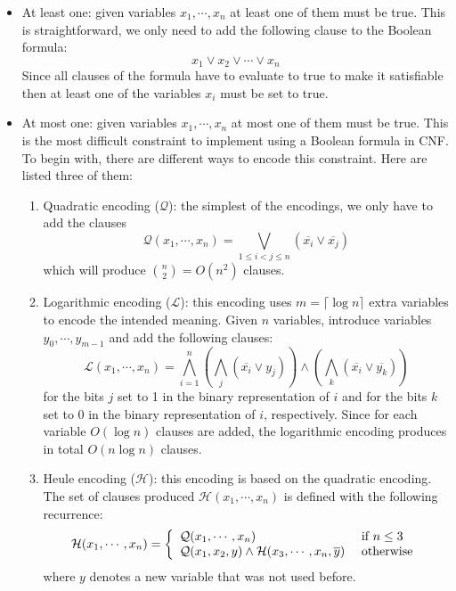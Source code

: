 \begin{itemize}
	\item At least one: given variables $x_1,\cdots,x_n$ at least
	one of them must be true. This is straightforward, we only need
	to add the following clause to the Boolean formula:
	\begin{equation}
	\label{eq:cnf:at-least-one}
	x_1 \vee x_2 \vee \cdots \vee x_n
	\end{equation}
	Since all clauses of the formula have to evaluate to true to make
	it satisfiable then at least one of the variables $x_i$ must be set to true.
	
	\item At most one: given variables $x_1,\cdots,x_n$ at most
	one of them must be true. This is the most difficult constraint
	to implement using a Boolean formula in CNF. To begin with, there
	are different ways to encode this constraint. Here are listed
	three of them:
	\begin{enumerate}
		\item Quadratic encoding ($\mathcal{Q}$): the simplest of the
		encodings, we only have to add the clauses
		\begin{equation}
		\label{eq:cnf:at-most-one:quad}
		\mathcal{Q}(x_1,\cdots, x_n) =
		\bigvee_{1 \le i < j \le n} (\overline{x_i}\vee\overline{x_j})
		\end{equation}
		which will produce $\binom{n}{2} = O(n^2)$ clauses.
		
		\item Logarithmic encoding ($\mathcal{L}$): this encoding uses
		$m = \lceil \log{n} \rceil$ extra variables to encode the
		intended meaning. Given $n$ variables, introduce variables
		$y_0,\cdots,y_{m-1}$ and add the following clauses:
		\begin{equation}
		\label{eq:cnf:at-most-one:log}
		\mathcal{L}(x_1,\cdots, x_n) = 
		\bigwedge_{i=1}^n
		\left(\bigwedge_{j} (\overline{x_i} \vee y_j) \right)
		\wedge
		\left(\bigwedge_{k} (\overline{x_i} \vee \overline{y_k}) \right)
		\end{equation}
		for the bits $j$ set to 1 in the binary representation of $i$ and
		for the bits $k$ set to 0 in the binary representation of $i$, respectively.
		Since for each variable $O(\log{n})$ clauses are added, the logarithmic
		encoding produces in total $O(n\log{n})$ clauses.
		
		\item Heule encoding ($\mathcal{H}$): this encoding is based on
		the quadratic encoding. The set of clauses produced $\mathcal{H}(x_1,\cdots, x_n)$
		is defined with the following recurrence:
		\begin{equation}
		\label{eq:cnf:at-most-one:heule}
		\mathcal{H}(x_1,\cdots, x_n) =
		\left\{
		\begin{array}{l l}
		\mathcal{Q}(x_1,\cdots, x_n) & \text{ if } n \le 3 \\
		\mathcal{Q}(x_1,x_2,y) \wedge \mathcal{H}(x_3,\cdots, x_n, \overline{y}) & \text{ otherwise}
		\end{array}
		\right.
		\end{equation}
		where $y$ denotes a new variable that was not used before.
	\end{enumerate}
\end{itemize}


